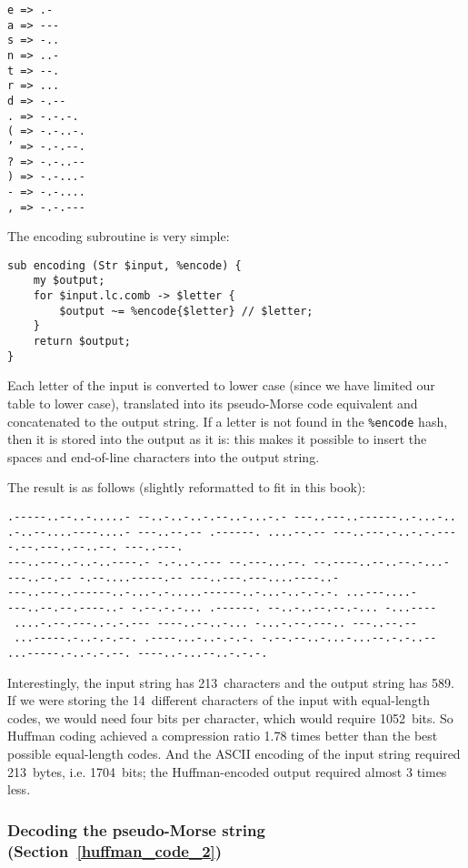 \begin{verbatim}
e => .-
a => ---
s => -..
n => ..-
t => --.
r => ...
d => -.--
. => -.-.-.
( => -.-..-.
’ => -.-.--.
? => -.-..--
) => -.-...-
- => -.-....
, => -.-.---
\end{verbatim}

The encoding subroutine is very simple:

\begin{verbatim}
sub encoding (Str $input, %encode) {
    my $output;
    for $input.lc.comb -> $letter {
        $output ~= %encode{$letter} // $letter;
    }
    return $output;
}
\end{verbatim}

Each letter of the input is converted to lower case (since we have 
limited our table to lower case), translated into its pseudo-Morse 
code equivalent and concatenated to the output string. If a letter
is not found in the \verb'%encode' hash, then it is stored into 
the output as it is: this makes it possible to insert the spaces 
and end-of-line characters into the output string.

The result is as follows (slightly reformatted to fit in this book):
\begin{verbatim}
.-----..--..-.....- --..-..-..-.--..-...-.- ---..---..------..-...-..
.-..--....----....- ---..--.-- .------. ....--.-- ---..---.-..-.-.---
-.--.---..--..--. ---..---.
---..---..-..-..----.- -.-..-.--- --.---...--. --.----..--..--.-...- 
---..--.-- -.--....-----.-- ---..---.---....----..-
---..---..------..-...-.-.....------..-...-..-.-.-. ...---....-
---..--.--.----..- -.--.-.-... .------. --..-..--.--.-... -...----
 ....-.--.---..-.-.--- ----..--..-... -...-.--.---.. ---..--.-- 
 ...-----.-..-.-.--. .----...-..-.-.-. -.--.--..-...-...--.-.-..--
...-----.-..-.-.--. ----..-...--..-.-.-.
\end{verbatim}

Interestingly, the input string has 213~characters and the output 
string has 589. If we were storing the 14~different characters of 
the input with equal-length codes, we would need four bits per 
character, which would require 1052~bits. So Huffman coding 
achieved a compression ratio 1.78 times better than the best possible 
equal-length codes. And the ASCII encoding of the input string 
required 213~bytes, i.e. 1704~bits; the Huffman-encoded output 
required almost 3 times less. 

\subsubsection{Decoding the pseudo-Morse string (Section~\ref{huffman_code_2})}

